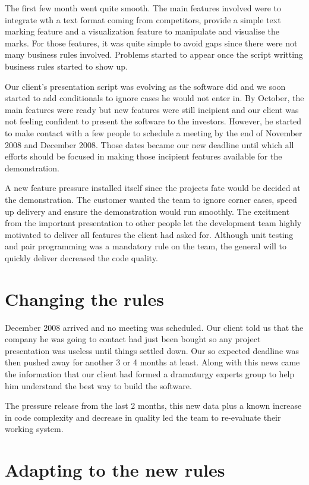 \documentclass[lnbip]{svmultln}
\begin{document}
The first few month went quite smooth. The main features involved were
to integrate wth a text format coming from competitors, provide a
simple text marking feature and a visualization feature to manipulate
and visualise the marks. For those features, it was quite simple to
avoid gaps since there were not many  business rules
involved. Problems started to appear once the script writting business
rules started to show up.

Our client's presentation script was evolving as the software did and
we soon started to add conditionals to ignore cases he would not enter
in. By October, the main features were ready but new features were
still incipient and our client was not feeling confident to present
the software to the investors. However, he started to make contact
with a few people to schedule a meeting by the end of November 2008
and December 2008. Those dates became our new deadline until which all
efforts should be focused in making those incipient features available
for the demonstration.

A new feature pressure installed itself since the projects fate would
be decided at the demonstration. The customer wanted the team to
ignore corner cases, speed up delivery and ensure the demonstration
would run smoothly. The excitment from the important presentation to
other people let the development team highly motivated to deliver all
features the client had asked for. Although unit testing and pair
programming was a mandatory rule on the team, the general will to
quickly deliver decreased the code quality.

\section{Changing the rules}
\label{sec:changes}

December 2008 arrived and no meeting was scheduled. Our client told us
that the company he was going to contact had just been bought so any
project presentation was useless until things settled down. Our so
expected deadline was then pushed away for another 3 or 4 months at
least. Along with this news came the information that our client had
formed a dramaturgy experts group to help him understand the best way
to build the software.

The pressure release from the last 2 months, this new data plus a
known increase in code complexity and decrease in quality led the
team to re-evaluate their working system.

\section{Adapting to the new rules}
\label{sec:adapting}
\end{document}

